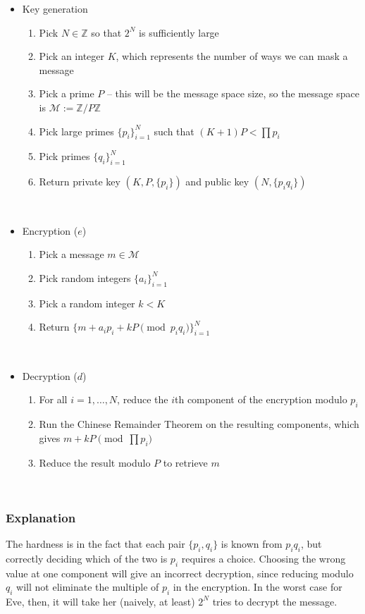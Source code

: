 \documentclass[11pt]{report}
\newcommand{\Z}{\mathbb{Z}}
\newcommand{\M}{\mathcal{M}}
\begin{document}
\begin{itemize}
\item Key generation
\begin{enumerate}
\item Pick $N\in \Z$ so that $2^N$ is sufficiently large
\item Pick an integer $K$, which represents the number of ways we can mask a message
\item Pick a prime $P$ -- this will be the message space size, so the message space is $\M := \Z/P\Z$
\item Pick large primes $\{p_i\}_{i=1}^N$ such that $(K+1)P<\prod p_i$
\item Pick primes $\{q_i\}_{i=1}^N$
\item Return private key $(K,P,\{p_i\})$ and public key $(N,\{p_iq_i\})$
\end{enumerate}

\

\item Encryption ($e$)
\begin{enumerate}
\item Pick a message $m\in \M$
\item Pick random integers $\{a_i\}_{i=1}^N$
\item Pick a random integer $k<K$
\item Return $\{m+a_ip_i+kP \pmod{p_iq_i}\}_{i=1}^N$
\end{enumerate}

\

\item Decryption ($d$)
\begin{enumerate}
\item For all $i=1,\ldots,N$, reduce the $i$th component of the encryption modulo $p_i$
\item Run the Chinese Remainder Theorem on the resulting components, which gives $m+kP \pmod{\prod p_i}$
\item Reduce the result modulo $P$ to retrieve $m$
\end{enumerate}
\end{itemize}

\

\subsubsection{Explanation}

The hardness is in the fact that each pair $\{p_i,q_i\}$ is known from $p_iq_i$, but correctly deciding which of the two is $p_i$ requires a choice. Choosing the wrong value at one component will give an incorrect decryption, since reducing modulo $q_i$ will not eliminate the multiple of $p_i$ in the encryption. In the worst case for Eve, then, it will take her (naively, at least) $2^N$ tries to decrypt the message.
\end{document}
